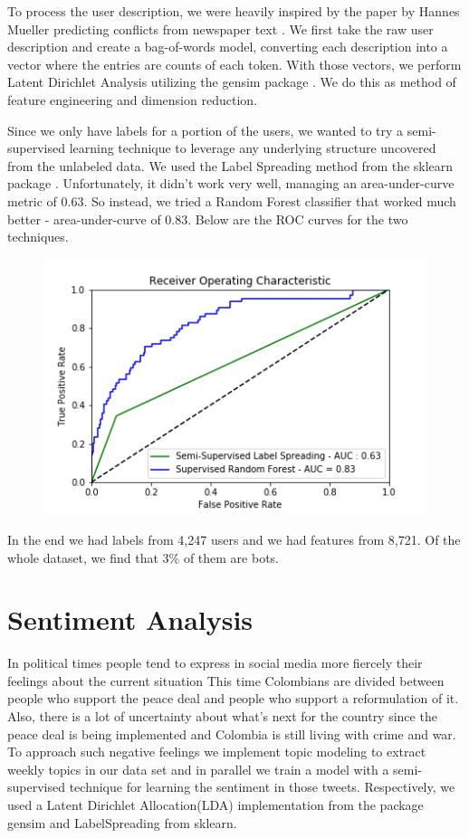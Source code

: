 \documentclass[10pt,a4paper]{article} %
\begin{document}
		To process the user description, we were heavily inspired by the paper by Hannes Mueller predicting conflicts from newspaper text \cite{mueller_rauh_2018}.  We first take the raw user description and create a bag-of-words model, converting each description into a vector where the entries are counts of each token.  With those vectors, we perform Latent Dirichlet Analysis utilizing the gensim package \cite{rehurek_lrec}.  We do this as method of feature engineering and dimension reduction.
		
		Since we only have labels for a portion of the users, we wanted to try a semi-supervised learning technique to leverage any underlying structure uncovered from the unlabeled data.  We used the Label Spreading method from the sklearn package \cite{scikit-learn}.  Unfortunately, it didn't work very well, managing an area-under-curve metric of 0.63.  So instead, we tried a Random Forest classifier that worked much better - area-under-curve of 0.83.  Below are the ROC curves for the two techniques.
		
		\begin{figure}[h!]
			\includegraphics[width=0.8\linewidth]{roc_curve}
			\centering
		\end{figure}
	
	\pagebreak 
	
	In the end we had labels from 4,247 users and we had features from 8,721.  Of the whole dataset, we find that 3\% of them are bots.
		
	\section{Sentiment Analysis}
In political times people tend to express in social media more fiercely their feelings about the current situation  This time Colombians are divided between people who support the peace deal and people who support a reformulation of it. Also, there is a lot of uncertainty about what's next for the country since the peace deal is being implemented and Colombia is still living with crime and war. To approach such negative feelings we implement topic modeling to extract weekly topics in our data set and in parallel we train a model with a semi-supervised technique for learning the sentiment in those tweets. Respectively, we used a Latent Dirichlet Allocation(LDA) implementation from the package gensim and LabelSpreading from sklearn.
\end{document}
